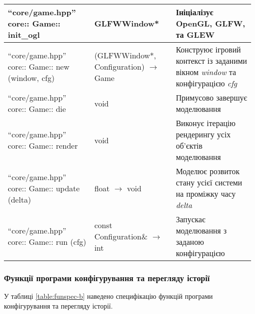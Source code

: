 \begin{longtable}{| C{6cm} | C{4cm} | C{5cm} |}
  \hline
  ``core/game.hpp'' \newline core:: \newline Game:: \newline
  init_ogl
  & GLFWWindow*
  & Ініціалізує OpenGL, GLFW, та GLEW \\
  \hline
  ``core/game.hpp'' \newline core:: \newline Game:: \newline
  new \newline (window, cfg)
  & (GLFWWindow*, Configuration) $\to$ Game
  & Конструює ігровий контекст із заданими вікном \emph{window}
  та конфігурацією \emph{cfg} \\
  \hline
  ``core/game.hpp'' \newline core:: \newline Game:: \newline
  die
  & void
  & Примусово завершує моделювання \\
  \hline
  ``core/game.hpp'' \newline core:: \newline Game:: \newline
  render
  & void
  & Виконує ітерацію рендерингу усіх об'єктів моделювання \\
  \hline
  ``core/game.hpp'' \newline core:: \newline Game:: \newline
  update \newline (delta)
  & float $\to$ void
  & Моделює розвиток стану усієї системи на проміжку часу \emph{delta} \\
  \hline
  ``core/game.hpp'' \newline core:: \newline Game:: \newline
  run \newline (cfg)
  & const Configuration\& $\to$ int
  & Запускає моделювання з заданою конфігурацією \\
  \hline
\end{longtable}\normalsize
\newpage
\subsubsection{Функції програми конфігурування та перегляду історії}

У таблиці \ref{table:funspec-b} наведено специфікацію функцій програми конфігурування та перегляду історії.

